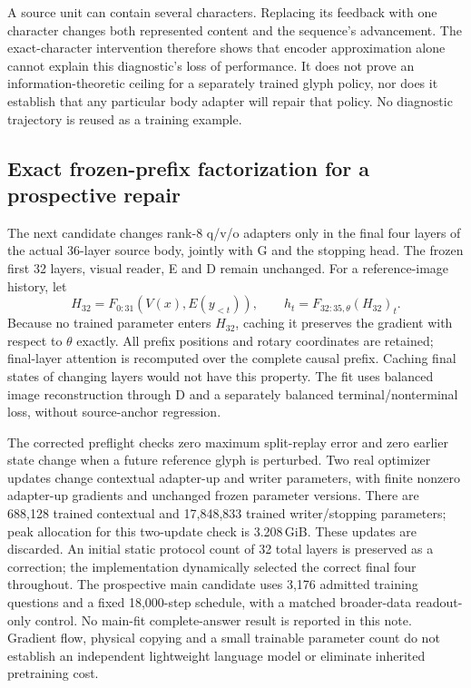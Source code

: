 A source unit can contain several characters. Replacing its feedback with
one character changes both represented content and the sequence's advancement.
The exact-character intervention therefore shows that encoder approximation
alone cannot explain this diagnostic's loss of performance. It does not prove
an information-theoretic ceiling for a separately trained glyph policy, nor
does it establish that any particular body adapter will repair that policy.
No diagnostic trajectory is reused as a training example.

\subsection*{Exact frozen-prefix factorization for a prospective repair}
The next candidate changes rank-8 q/v/o adapters only in the final four layers
of the actual 36-layer source body, jointly with G and the stopping head.
The frozen first 32 layers, visual reader, E and D remain unchanged. For a
reference-image history, let
\[
 H_{32}=F_{0:31}(V(x),E(y_{<t})),\qquad
 h_t=F_{32:35,\theta}(H_{32})_t.
\]
Because no trained parameter enters $H_{32}$, caching it preserves the gradient
with respect to $\theta$ exactly. All prefix positions and rotary coordinates
are retained; final-layer attention is recomputed over the complete causal
prefix. Caching final states of changing layers would not have this property.
The fit uses balanced image reconstruction through D and a separately balanced
terminal/nonterminal loss, without source-anchor regression.

The corrected preflight checks zero maximum split-replay error and zero earlier
state change when a future reference glyph is perturbed. Two real optimizer
updates change contextual adapter-up and writer parameters, with finite nonzero
adapter-up gradients and unchanged frozen parameter versions. There are 688,128
trained contextual and 17,848,833 trained writer/stopping parameters; peak
allocation for this two-update check is 3.208\,GiB. These updates are discarded.
An initial static protocol count of 32 total layers is preserved as a correction;
the implementation dynamically selected the correct final four throughout.
The prospective main candidate uses 3,176 admitted training questions and a
fixed 18,000-step schedule, with a matched broader-data readout-only control.
No main-fit complete-answer result is reported in this note. Gradient flow,
physical copying and a small trainable parameter count do not establish an
independent lightweight language model or eliminate inherited pretraining cost.

